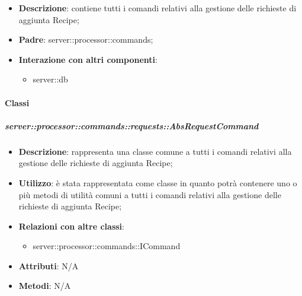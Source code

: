       \begin{itemize}
        \item \textbf{Descrizione}: contiene tutti i comandi relativi alla gestione delle richieste di aggiunta Recipe;
        \item \textbf{Padre}: server::processor::commands;
        \item \textbf{Interazione con altri componenti}:
          \begin{itemize}
            \item server::db
          \end{itemize}
      \end{itemize}

        \paragraph{Classi} %

        \subparagraph{server::processor::commands::requests::AbsRequestCommand} %
        \label{subp:bdsm_app_server_processor_commands_requests_absrequestcommand}
        \begin{itemize}
          \item \textbf{Descrizione}: rappresenta una classe comune a tutti i comandi relativi alla gestione delle richieste di aggiunta Recipe;
          \item \textbf{Utilizzo}: è stata rappresentata come classe in quanto potrà contenere uno o più metodi di utilità comuni a tutti i comandi relativi alla gestione delle richieste di aggiunta Recipe;
          \item \textbf{Relazioni con altre classi}:
            \begin{itemize}
              \item server::processor::commands::ICommand
            \end{itemize}
			\item \textbf{Attributi}: N/A
			\item \textbf{Metodi}: N/A
        \end{itemize}

